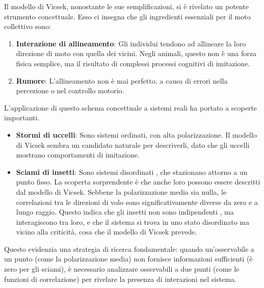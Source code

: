 Il modello di Vicsek, nonostante le sue semplificazioni, si è rivelato un potente strumento concettuale. Esso ci insegna che gli ingredienti essenziali per il moto collettivo sono:
\begin{enumerate}
    \item \textbf{Interazione di allineamento}: Gli individui tendono ad allineare la loro direzione di moto con quella dei vicini. Negli animali, questo non è una forza fisica semplice, ma il risultato di complessi processi cognitivi di imitazione.
    \item \textbf{Rumore}: L'allineamento non è mai perfetto, a causa di errori nella percezione o nel controllo motorio.
\end{enumerate}
L'applicazione di questo schema concettuale a sistemi reali ha portato a scoperte importanti.
\begin{itemize}
    \item \textbf{Stormi di uccelli}: Sono sistemi ordinati, con alta polarizzazione. Il modello di Vicsek sembra un candidato naturale per descriverli, dato che gli uccelli mostrano comportamenti di imitazione.
    \item \textbf{Sciami di insetti}: Sono sistemi disordinati , che stazionano attorno a un punto fisso. La scoperta sorprendente è che anche loro possono essere descritti dal modello di Vicsek. Sebbene la polarizzazione media sia nulla, le correlazioni tra le direzioni di volo sono significativamente diverse da zero e a lungo raggio. Questo indica che gli insetti non sono indipendenti , ma interagiscono tra loro, e che il sistema si trova in uno stato disordinato ma vicino alla criticità, cosa che il modello di Vicsek prevede.
\end{itemize}
Questo evidenzia una strategia di ricerca fondamentale: quando un'osservabile a un punto (come la polarizzazione media) non fornisce informazioni sufficienti (è zero per gli sciami), è necessario analizzare osservabili a due punti (come le funzioni di correlazione) per rivelare la presenza di interazioni nel sistema.
